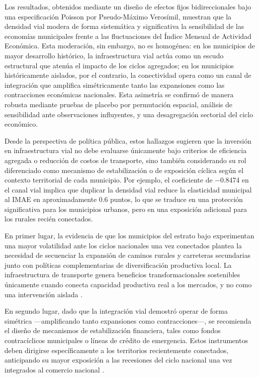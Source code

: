 \documentclass[
  spanish,
  12pt,
  letterpaper]{article}
\begin{document}
Los resultados, obtenidos mediante un diseño de efectos fijos
bidireccionales bajo una especificación Poisson por Pseudo-Máximo
Verosímil, muestran que la densidad vial modera de forma sistemática y
significativa la sensibilidad de las economías municipales frente a las
fluctuaciones del Índice Mensual de Actividad Económica. Esta
moderación, sin embargo, no es homogénea: en los municipios de mayor
desarrollo histórico, la infraestructura vial actúa como un escudo
estructural que atenúa el impacto de los ciclos agregados; en los
municipios históricamente aislados, por el contrario, la conectividad
opera como un canal de integración que amplifica simétricamente tanto
las expansiones como las contracciones económicas nacionales. Esta
asimetría se confirmó de manera robusta mediante pruebas de placebo por
permutación espacial, análisis de sensibilidad ante observaciones
influyentes, y una desagregación sectorial del ciclo económico.

Desde la perspectiva de política pública, estos hallazgos sugieren que
la inversión en infraestructura vial no debe evaluarse únicamente bajo
criterios de eficiencia agregada o reducción de costos de transporte,
sino también considerando su rol diferenciado como mecanismo de
estabilización o de exposición cíclica según el contexto territorial de
cada municipio. Por ejemplo, el coeficiente de −0.8474 en el canal vial
implica que duplicar la densidad vial reduce la elasticidad municipal al
IMAE en aproximadamente 0.6 puntos, lo que se traduce en una protección
significativa para los municipios urbanos, pero en una exposición
adicional para los rurales recién conectados.

En primer lugar, la evidencia de que los municipios del estrato bajo
experimentan una mayor volatilidad ante los ciclos nacionales una vez
conectados plantea la necesidad de secuenciar la expansión de caminos
rurales y carreteras secundarias junto con políticas complementarias de
diversificación productiva local. La infraestructura de transporte
genera beneficios transformacionales sostenibles únicamente cuando
conecta capacidad productiva real a los mercados, y no como una
intervención aislada \parencite{asher2020rural, kline2014local}.

En segundo lugar, dado que la integración vial demostró operar de forma
simétrica ---amplificando tanto expansiones como contracciones---, se
recomienda el diseño de mecanismos de estabilización financiera, tales
como fondos contracíclicos municipales o líneas de crédito de
emergencia. Estos instrumentos deben dirigirse específicamente a los
territorios recientemente conectados, anticipando su mayor exposición a
las recesiones del ciclo nacional una vez integrados al comercio
nacional \parencite{blanchard1992regional, martin2012regional}.
\end{document}
